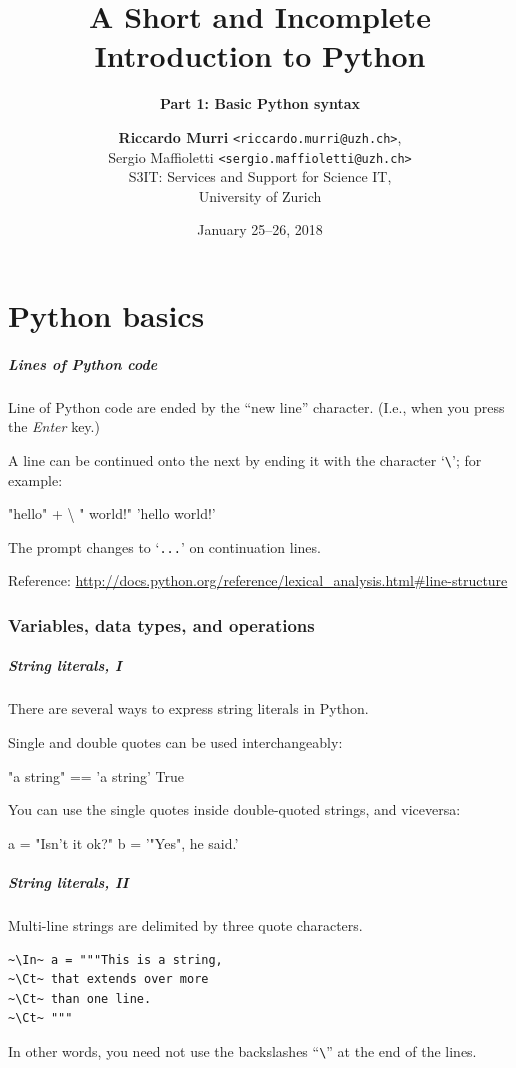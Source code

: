 \documentclass[english,serif,mathserif,xcolor=pdftex,dvipsnames,table]{beamer}
\title[1. Basics]{%
  A Short and Incomplete Introduction to Python
}
\subtitle{\bfseries Part 1: Basic Python syntax}
\author[R.~Murri]{%
  \textbf{Riccardo Murri} \texttt{<riccardo.murri@uzh.ch>}, \\
  Sergio Maffioletti \texttt{<sergio.maffioletti@uzh.ch>}
  \\
  S3IT: Services and Support for Science IT,
  \\
  University of Zurich
}
\date{January 25--26, 2018}
\begin{document}
\maketitle

\part{Python basics}

\begin{frame}[fragile]
  \frametitle{Lines of Python code}
  Line of Python code are ended by the ``new line'' character. (I.e., when you
  press the \emph{Enter} key.)

  \+
  A line can be continued onto the next by ending it with the
  character `\texttt{\textbackslash}'; for example:
\begin{semiverbatim}
\In "hello" + \textbackslash
\Ct " world!"
\Out 'hello world!'
\end{semiverbatim}
  The prompt changes to `\texttt{...}' on continuation lines.

  \+\scriptsize
  Reference:
  \url{http://docs.python.org/reference/lexical_analysis.html#line-structure}
\end{frame}


\section{Variables, data types, and operations}

\begin{frame}[fragile]
  \frametitle{String literals, I}
  There are several ways to express string literals in Python.

  \+
  Single and double quotes can be used interchangeably:
\begin{semiverbatim}
\In "a string" == 'a string'
\Out True
\end{semiverbatim}

  \+
  You can use the single quotes inside double-quoted strings, and viceversa:
\begin{semiverbatim}
\In a = "Isn't it ok?"
\In b = '"Yes", he said.'
\end{semiverbatim}
\end{frame}


\begin{frame}[fragile]
  \frametitle{String literals, II}
  Multi-line strings are delimited by three quote characters.
\begin{lstlisting}[showstringspaces=false]
~\In~ a = """This is a string,
~\Ct~ that extends over more
~\Ct~ than one line.
~\Ct~ """
\end{lstlisting}

  \+ In other words, you need not use the backslashes
  ``\texttt{\textbackslash}'' at the end of the lines.
\end{frame}
\end{document}
